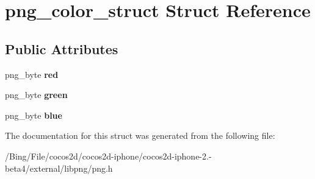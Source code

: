 \hypertarget{structpng__color__struct}{\section{png\-\_\-color\-\_\-struct Struct Reference}
\label{structpng__color__struct}
}
\subsection*{Public Attributes}
\begin{DoxyCompactItemize}
\item 
\hypertarget{structpng__color__struct_ad39dc2d7cb82e3670a3ad397bb4083cb}{png\-\_\-byte {\bfseries red}}\label{structpng__color__struct_ad39dc2d7cb82e3670a3ad397bb4083cb}

\item 
\hypertarget{structpng__color__struct_ada9b5a911b185eaf7c6b87934e9f11ce}{png\-\_\-byte {\bfseries green}}\label{structpng__color__struct_ada9b5a911b185eaf7c6b87934e9f11ce}

\item 
\hypertarget{structpng__color__struct_a528e625b2778e787dc182e5df1164bbc}{png\-\_\-byte {\bfseries blue}}\label{structpng__color__struct_a528e625b2778e787dc182e5df1164bbc}

\end{DoxyCompactItemize}


The documentation for this struct was generated from the following file\-:\begin{DoxyCompactItemize}
\item 
/\-Bing/\-File/cocos2d/cocos2d-\/iphone/cocos2d-\/iphone-\/2.-\/beta4/external/libpng/png.\-h\end{DoxyCompactItemize}
